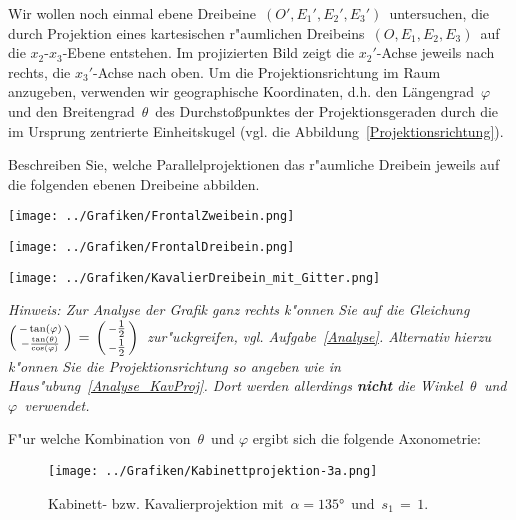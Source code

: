 \begin{Aufgabe}
\footnotesize
Wir wollen noch einmal ebene Dreibeine\, $(O', E_1', E_2', E_3')$\, untersuchen, die durch Projektion eines kartesischen r"aumlichen Dreibeins\, $(O, E_1, E_2, E_3)$\, auf die $x_2$-$x_3$-Ebene entstehen. Im projizierten Bild zeigt die $x_2'$-Achse jeweils nach rechts, die $x_3'$-Achse nach oben. Um die
Projektionsrichtung im Raum anzugeben, verwenden wir \glqq geographische Koordinaten\grqq, d.h. den Längengrad \,$\varphi$\, und den Breitengrad  \,$\theta$\, des Durchstoßpunktes der Projektionsgeraden durch die im Ursprung zentrierte Einheitskugel (vgl. die Abbildung~\ref{Projektionsrichtung}).
\small

Beschreiben Sie, welche Parallelprojektionen das r"aumliche Dreibein jeweils auf die folgenden ebenen Dreibeine abbilden.\\
\begin{minipage}{0.33\textwidth}
\texttt{[image: ../Grafiken/FrontalZweibein.png]}
\end{minipage}
\hspace{0.02\textwidth}
\begin{minipage}{0.3\textwidth}
\texttt{[image: ../Grafiken/FrontalDreibein.png]}
\end{minipage}
\hspace{0.02\textwidth}
\begin{minipage}{0.3\textwidth}
\texttt{[image: ../Grafiken/KavalierDreibein\_mit\_Gitter.png]}
\end{minipage}

\textit{Hinweis: Zur Analyse der Grafik ganz rechts k"onnen Sie auf die Gleichung\,  $\begin{psmallmatrix} - \tan(\varphi) \\ - \frac{\tan(\theta)}{\cos(\varphi)} \end{psmallmatrix}\, =\, \begin{psmallmatrix} -\tfrac{1}{2}\\ -\tfrac{1}{2}\end{psmallmatrix}$\, zur"uckgreifen, vgl. Aufgabe~\ref{Analyse}. Alternativ hierzu k"onnen Sie die Projektionsrichtung so angeben wie in Haus"ubung~\ref{Analyse_KavProj}. Dort werden allerdings \textbf{nicht} die Winkel\, $\theta$\, und\, $\varphi$\, verwendet.}
\begin{Teilaufgaben}
\item F"ur welche Kombination von\, $\theta$\, und  $\varphi$ ergibt sich die folgende Axonometrie:
 \begin{figure}[ht]
  \centering
  \texttt{[image: ../Grafiken/Kabinettprojektion-3a.png]}
  \caption{Kabinett- bzw. Kavalierprojektion mit\, $\alpha = \ang{135}$\, und \,$s_1\, =\,1$.}
  \label{KabinettprojTut}
  \end{figure}


\end{Teilaufgaben}
\end{Aufgabe}
